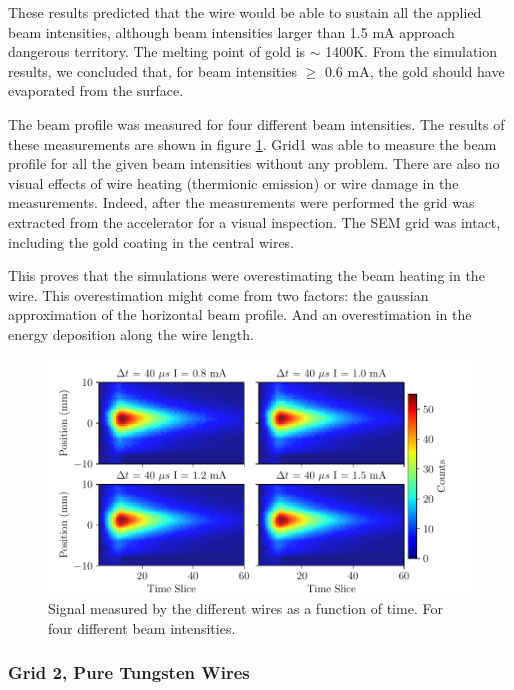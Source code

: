 These results predicted that the wire would be able to sustain all the applied beam intensities, although beam intensities larger than 1.5 mA approach dangerous territory. The melting point of gold is $\sim$ 1400K. From the simulation results, we concluded that, for beam intensities $\geq$ 0.6 mA, the gold should have evaporated from the surface. 

The beam profile was measured for four different beam intensities. The results of these measurements are shown in figure \ref{fig:FancyStudy1Plot}. Grid1 was able to measure the beam profile for all the given beam intensities without any problem. There are also no visual effects of wire heating (thermionic emission) or wire damage in the measurements. Indeed, after the measurements were performed the grid was extracted from the accelerator for a visual inspection. The SEM grid was intact, including the gold coating in the central wires. 

This proves that the simulations were overestimating the beam heating in the wire. This overestimation might come from two factors: the gaussian approximation of the horizontal beam profile. And an overestimation in the energy deposition along the wire length.  

\begin{figure}[h]
    \vspace{-0.4cm}
    \hspace{0.1cm}
    \centering
    \includegraphics[width=1.0\columnwidth]{FancyPlotStudy1/FancyMeasStudy1.pdf}
    \caption{Signal measured by the different wires as a function of time. For four different beam intensities. }
    \label{fig:FancyStudy1Plot}
\end{figure}

\subsubsection{Grid 2, Pure Tungsten Wires}

